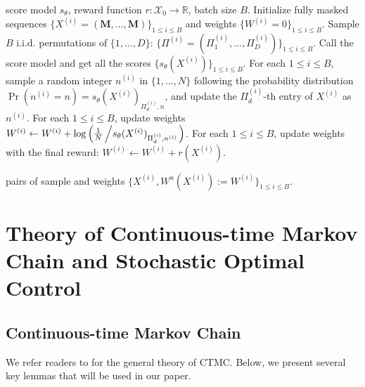 \documentclass{article}
\theoremstyle{remark}
\newcommand{\ro}[1]{\left(#1\right)} %
\newcommand{\R}{\mathbb{R}}
\newcommand{\cX}{\mathcal{X}}
\newcommand{\mask}{\mathbf{M}}
\begin{document}
\begin{algorithm}[h]
\caption{\texttt{Sample\_Trajectories}: Sample trajectories and compute weights}
\label{alg:sample_traj}
\begin{algorithmic}[1]
\Require score model $s_{\theta}$, reward function $r:\cX_0\to\R$, batch size $B$.
\State Initialize fully masked sequences $\{X^{(i)}=(\mask,...,\mask)\}_{1\le i\le B}$ and weights $\{W^{(i)}=0\}_{1\le i\le B}$.
\State Sample $B$ i.i.d. permutations of $\{1,...,D\}$: $\{\Pi^{(i)}=(\Pi^{(i)}_1,...,\Pi^{(i)}_D)\}_{1\le i\le B}$.
    \State Call the score model and get all the scores $\{s_\theta(X^{(i)})\}_{1\le i\le B}$.
    \State For each $1\le i\le B$, sample a random integer $n^{(i)}$ in $\{1,...,N\}$ following the probability distribution $\Pr(n^{(i)}=n)=s_\theta(X^{(i)})_{\Pi^{(i)}_d,n}$, and update the $\Pi^{(i)}_d$-th entry of $X^{(i)}$ as $n^{(i)}$.
    \State For each $1\le i\le B$, update weights $W^{(i)}\gets W^{(i)}+\log\ro{\frac{1}{N}\left/s_\theta(X^{(i)})_{\Pi^{(i)}_d,n^{(i)}}\right.}$.
\EndFor
\State For each $1\le i\le B$, update weights with the final reward: $W^{(i)}\gets W^{(i)}+r(X^{(i)})$.

\noindent\Return pairs of sample and weights $\{X^{(i)},W^u(X^{(i)}):=W^{(i)}\}_{1\le i\le B}$.
\end{algorithmic}
\end{algorithm}



\section{Theory of Continuous-time Markov Chain and Stochastic Optimal Control} 
\label{app:theory}
\subsection{Continuous-time Markov Chain}
\label{app:theory_ctmc}

We refer readers to \cite{campbell2022continuous,lou2024discrete,sun2023score,lou2024discrete,chen2025convergence,ren2025how,ren2025fast} for the general theory of CTMC. Below, we present several key lemmas that will be used in our paper.
\end{document}
